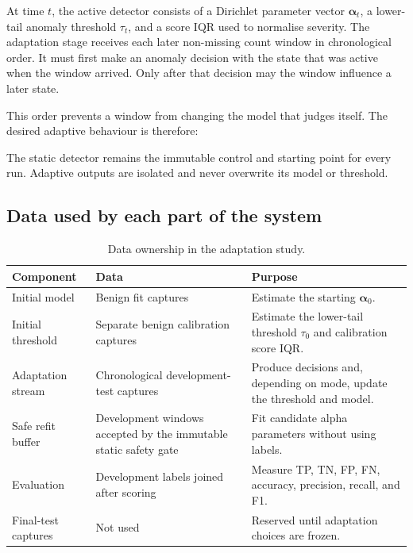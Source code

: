 \documentclass[11pt,a4paper]{article}
\begin{document}
At time $t$, the active detector consists of a Dirichlet parameter vector
$\boldsymbol{\alpha}_t$, a lower-tail anomaly threshold $\tau_t$, and a score
IQR used to normalise severity. The adaptation stage receives each later
non-missing count window in chronological order. It must first make an anomaly
decision with the state that was active when the window arrived. Only after
that decision may the window influence a later state.

This order prevents a window from changing the model that judges itself. The
desired adaptive behaviour is therefore:

\begin{center}
\end{center}

The static detector remains the immutable control and starting point for every
run. Adaptive outputs are isolated and never overwrite its model or threshold.

\subsection{Data used by each part of the system}

\begin{table}[ht]
\centering
\small
\begin{tabularx}{\textwidth}{>{\raggedright\arraybackslash}p{}
>{\raggedright\arraybackslash}p{} X}
\toprule
\textbf{Component} & \textbf{Data} & \textbf{Purpose} \\
\midrule
Initial model & Benign fit captures & Estimate the starting
$\boldsymbol{\alpha}_0$. \\
Initial threshold & Separate benign calibration captures & Estimate the
lower-tail threshold $\tau_0$ and calibration score IQR. \\
Adaptation stream & Chronological development-test captures & Produce
decisions and, depending on mode, update the threshold and model. \\
Safe refit buffer & Development windows accepted by the immutable static
safety gate & Fit candidate alpha parameters without using labels. \\
Evaluation & Development labels joined after scoring & Measure TP, TN, FP,
FN, accuracy, precision, recall, and F1. \\
Final-test captures & Not used & Reserved until adaptation choices are frozen.
\\
\bottomrule
\end{tabularx}
\caption{Data ownership in the adaptation study.}
\label{tab:data-ownership}
\end{table}
\end{document}
